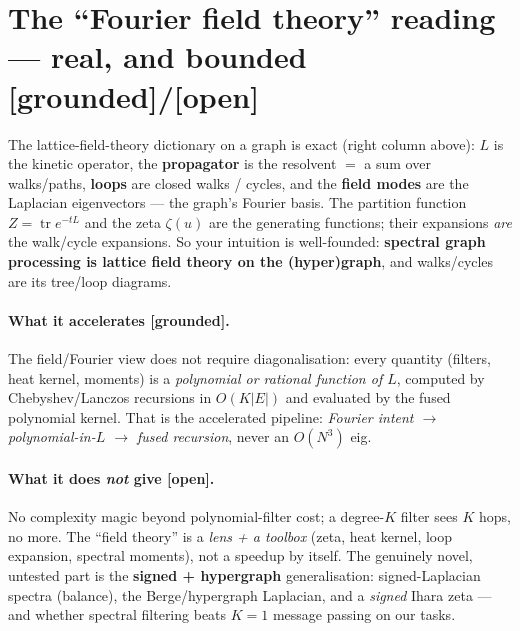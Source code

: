 \documentclass[11pt]{article}
\newcommand{\grd}{\textcolor{green!50!black}{\textbf{[grounded]}}}
\newcommand{\opn}{\textcolor{orange!80!black}{\textbf{[open]}}}
\begin{document}
\section{The ``Fourier field theory'' reading --- real, and bounded \grd/\opn}
The lattice-field-theory dictionary on a graph is exact (right column above): $L$ is the kinetic operator, the
\textbf{propagator} is the resolvent $=$ a sum over walks/paths, \textbf{loops} are closed walks / cycles, and
the \textbf{field modes} are the Laplacian eigenvectors --- the graph's Fourier basis. The partition function
$Z=\operatorname{tr}e^{-tL}$ and the zeta $\zeta(u)$ are the generating functions; their expansions \emph{are}
the walk/cycle expansions. So your intuition is well-founded: \textbf{spectral graph processing is lattice field
theory on the (hyper)graph}, and walks/cycles are its tree/loop diagrams.

\paragraph{What it accelerates \grd.} The field/Fourier view does not require diagonalisation: every quantity
(filters, heat kernel, moments) is a \emph{polynomial or rational function of $L$}, computed by Chebyshev/Lanczos
recursions in $O(K|E|)$ and evaluated by the fused polynomial kernel. That is the accelerated pipeline:
\emph{Fourier intent $\to$ polynomial-in-$L$ $\to$ fused recursion}, never an $O(N^3)$ eig.

\paragraph{What it does \emph{not} give \opn.} No complexity magic beyond polynomial-filter cost; a degree-$K$
filter sees $K$ hops, no more. The ``field theory'' is a \emph{lens + a toolbox} (zeta, heat kernel, loop
expansion, spectral moments), not a speedup by itself. The genuinely novel, untested part is the
\textbf{signed + hypergraph} generalisation: signed-Laplacian spectra (balance), the Berge/hypergraph Laplacian,
and a \emph{signed} Ihara zeta --- and whether spectral filtering beats $K{=}1$ message passing on our tasks.
\end{document}
